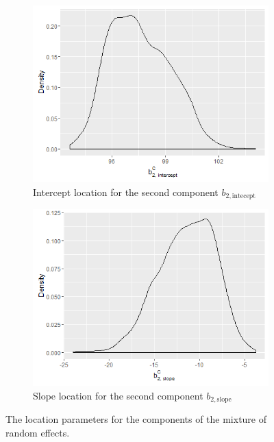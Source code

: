 \begin{figure}[!htb]
\begin{subfigure}[b]{0.4\textwidth}
		\includegraphics[width=\textwidth]{mainmatter/chapter_6_blood_donor/b21.png}	
          \caption{\label{fig : mu_blood_donor_21}Intercept location for the second component $b_{2, \text{intecept}}$}
	\end{subfigure}	
	\begin{subfigure}[b]{0.4\textwidth}
		\includegraphics[width=\textwidth]{mainmatter/chapter_6_blood_donor/b22.png}	
          \caption{\label{fig : mu_blood_donor_22}Slope location for the second component $b_{2, \text{slope}}$}
	\end{subfigure}	
	\caption{The location parameters for the components of the mixture of random effects.}
	\label{fig : mu_blood_donor}    
\end{figure} 

